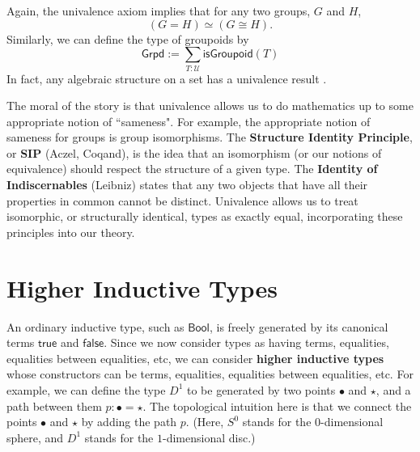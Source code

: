 \documentclass{amsart}
\theoremstyle{definition}
\newcommand{\Bool}{\ensuremath{\mathsf{Bool}}}
\newcommand{\isGroupoid}{\ensuremath{\mathsf{isGroupoid}}}
\newcommand{\Grpd}{\ensuremath{\mathsf{Grpd}}}
\newcommand{\U}{\ensuremath{\mathcal{U}}}
\newcommand{\True}{\ensuremath{\mathsf{true}}}
\newcommand{\False}{\ensuremath{\mathsf{false}}}
\renewcommand{\emph}{\textbf}
\begin{document}

Again, the univalence axiom implies that for any two groups, $G$ and $H$,
\[(G = H)\simeq (G \cong H).\]
Similarly, we can define the type of groupoids by
\[\Grpd:= \sum_{T:\U} \isGroupoid(T)\]
In fact, any algebraic structure on a set has a univalence result \cite{coq:isomorphism-is-equality}.


The moral of the story is that univalence allows us to do mathematics up to some appropriate notion of ``sameness".
For example, the appropriate notion of sameness for groups is group isomorphisms.
The \textbf{Structure Identity Principle}, or \textbf{SIP} (Aczel, Coqand), is the idea that an isomorphism (or our notions of equivalence) should respect the structure of a given type.
The \textbf{Identity of Indiscernables} (Leibniz) states that any two objects that have all their properties in common cannot be distinct.
Univalence allows us to treat isomorphic, or structurally identical, types as exactly equal, incorporating these principles into our theory.

\section{Higher Inductive Types}
An ordinary inductive type, such as $\Bool$, is freely generated by its canonical terms $\True$ and $\False$.
Since we now consider types as having terms, equalities, equalities between equalities, etc, we can consider \emph{higher inductive types} whose constructors can be terms, equalities, equalities between equalities, etc.
For example, we can define the type $D^{1}$ to be generated by two points $\bullet$ and $\star$, and a path between them $p : \bullet = \star$.
The topological intuition here is that we connect the points $\bullet$ and $\star$ by adding the path $p$. 
(Here, $S^0$ stands for the $0$-dimensional sphere, and $D^1$ stands for the $1$-dimensional disc.)
\end{document}
